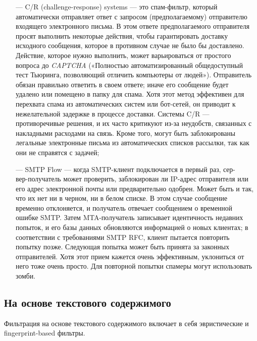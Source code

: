 \begin{itemize}
    \item[—] C/R (challenge-response) systems — это спам-фильтр, который автоматически отправляет
        ответ с запросом (предполагаемому) отправителю входящего электронного письма. В этом
        ответе предполагаемого отправителя просят выполнить некоторые действия, чтобы гарантировать
        доставку исходного сообщения, которое в противном случае не было бы доставлено. Действие, которое
        нужно выполнить, может варьироваться от простого вопроса до \emph{CAPTCHA} («Полностью автоматизированный
        общедоступный тест Тьюринга, позволяющий отличить компьютеры от людей»). Отправитель обязан правильно
        ответить в своем ответе; иначе его сообщение будет удалено или помещено в папку для спама. Хотя этот
        метод эффективен для перехвата спама из автоматических систем или бот-сетей, он приводит к нежелательной
        задержке в процессе доставки.
        Системы C/R — противоречивые решения, и их часто критикуют из-за неудобств, связанных с накладными расходами
        на связь. Кроме того, могут быть заблокированы легальные электронные письма из автоматических списков
        рассылки, так как они не справятся с задачей;
    \item[—] SMTP Flow — когда SMTP-клиент подключается в первый раз, сер-\\вер-получатель может проверить,
        заблокирован ли IP-адрес отправителя или его адрес электронной почты или предварительно одобрен.
        Может быть и так, что их нет ни в черном, ни в белом списке. В этом случае сообщение временно отклоняется,
        и получатель отвечает сообщением о временной ошибке SMTP. Затем MTA-получатель записывает идентичность недавних 
        попыток, и его базы данных обновляются информацией о новых клиентах; в соответствии с требованиями SMTP RFC, 
        клиент пытается повторить попытку позже. Следующая попытка может быть принята за законных отправителей. 
        Хотя этот прием кажется очень эффективным, уклониться от него тоже очень просто. Для повторной попытки спамеры 
        могут использовать зомби.
\end{itemize}

\subsection{На основе текстового содержимого}
Фильтрация на основе текстового содержимого включает в себя эвристические и fingerprint-based фильтры.


